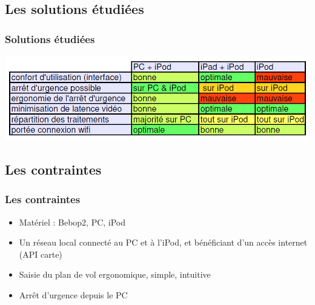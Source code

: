 \documentclass{beamer}
\begin{document}
	\begin{frame}
	\section{Les solutions étudiées}
		\begin{center}
		\frametitle{Solutions étudiées}
            \includegraphics[scale=0.45]{comparatif_v2.PNG}
		\end{center}
	\end{frame}
	\begin{frame}
	\section{Les contraintes}
		\begin{center}
		\frametitle{Les contraintes}
           	\begin{itemize}
                \item Matériel : Bebop2, PC, iPod
                \item Un réseau local connecté au PC et à l'iPod, et bénéficiant d'un accès internet (API carte)
                \item Saisie du plan de vol ergonomique, simple, intuitive
                \item Arrêt d'urgence depuis le PC
            \end{itemize}
		\end{center}
	\end{frame}
\end{document}
